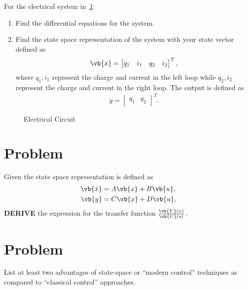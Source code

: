 \documentclass[titlepage, 11pt, reqno]{article}    %
\begin{document}
For the electrical system in~\cref{fig:elec_circuit_2}:
\begin{enumerate}
    \item Find the differential equations for the system.
    \item Find the state space representation of the system with your state vector defined as
        \begin{align*}
        \vb{x} = \begin{bmatrix}q_1 & i_1 & q_2 & i_2\end{bmatrix}^T,
        \end{align*}
        where \(q_1, i_1\) represent the charge and current in the left loop while \(q_2, i_2\) represent the charge and current in the right loop. 
        The output is defined as
        \begin{align*}
        y = \begin{bmatrix} q_1 & q_2 \end{bmatrix}^T.
        \end{align*}
\end{enumerate}
\begin{figure}[htbp]
\centering
\begin{scaletikzpicturetowidth}{0.8\textwidth}
\end{scaletikzpicturetowidth}
\caption{Electrical Circuit~\label{fig:elec_circuit_2}}
\end{figure}
\clearpage

\section{Problem}
Given the state space representation is defined as
\begin{align*}
    \vb{\dot{x}} &= A \vb{x} + B \vb{u}, \\
    \vb{y} &= C \vb{x} + D\vb{u},
\end{align*}
\textbf{DERIVE} the expression for the transfer function \(\frac{\vb{Y}(x)}{\vb{U}(s)}\).
\vspace{13cm}
\section{Problem}

List at least two advantages of state-space or ``modern control'' techniques as compared to ``classical control'' approaches.
\vspace{5cm}
\clearpage
\end{document}
